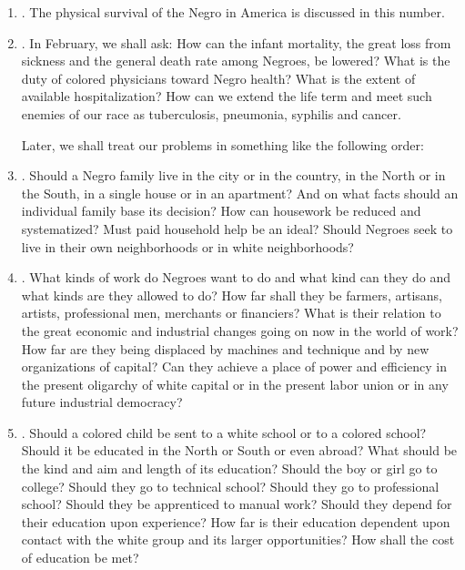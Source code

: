 \documentclass[letterpaper,10pt,english]{jupyterBook}
\begin{document}
\begin{enumerate}
%
\item {} 
\sphinxAtStartPar
{}. The physical survival of the Negro in America is discussed in this number.

\item {} 
\sphinxAtStartPar
{}. In February, we shall ask: How can the infant mortality, the great loss from sickness and the general death rate among Negroes, be lowered? What is the duty of colored physicians toward  Negro health? What is the extent of available hospitalization? How can we extend the life term and meet such enemies of our race as tuberculosis, pneumonia, syphilis and cancer.

Later, we shall treat our problems in something like the following order:


\item {} 
\sphinxAtStartPar
{}. Should a Negro family live in the city or in the country, in the North or in the South, in a single house or in an apartment? And on what facts should an individual family base its decision? How can housework be reduced and systematized? Must paid household help be an ideal? Should Negroes seek to live in their own neighborhoods or in white neighborhoods?

\item {} 
\sphinxAtStartPar
{}. What kinds of work do Negroes want to do and what kind can they do and what kinds are they allowed to do? How far shall they be farmers, artisans, artists, professional men, merchants or financiers? What is their relation to the great economic and industrial changes going on now in the world of work? How far are they being displaced by machines and technique and by new organizations of capital? Can they achieve a place of power and efficiency in the present oligarchy of white capital or in the present labor union or in any future industrial democracy?

\item {} 
\sphinxAtStartPar
{}. Should a colored child be sent to a white school or to a colored school? Should it be educated in the North or South or even abroad? What should be the kind and aim and length of its education? Should the boy or girl go to college? Should they go to technical school? Should they go to professional school? Should they be apprenticed to manual work? Should they depend for their education upon experience? How far is their education dependent upon contact with the white group and its larger opportunities? How shall the cost of education be met?


\end{enumerate}
\end{document}
